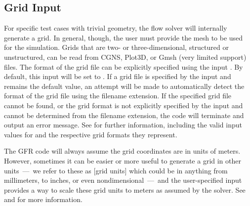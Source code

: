 \subsection{Grid Input}
\label{SEC:Files:Grid_Input}


For specific test cases with trivial geometry, the flow solver will internally
generate a grid.
%
In general, though, the user must provide the mesh to be used for the
simulation.  
%
Grids that are two- or three-dimensional, structured or unstructured, can be
read from 
  CGNS,
  Plot3D, or
  Gmsh (very limited support)
files.
%
The format of the grid file can be explicitly specified using the input
.
%
By default, this input will be set to .
%
If a grid file is specified by the input  and
 remains the default value,
an attempt will be made to automatically detect the format of the grid file
using the filename extension.
%
If the specified grid file cannot be found, or the grid format is not explicitly
specified by the input and cannot be determined from the filename extension, the
code will terminate and output an error message.
%
See  for further information, including the valid input
values for  and the respective grid formats they
represent.


The GFR code will always assume the grid coordinates are in units of meters.
%
However, sometimes it can be easier or more useful to generate a grid in other
units~---~we refer to these as
[grid units] which could be in anything
from millimeters, to inches, or even nondimensional~---~and the user-specified
input  provides a way to scale these grid units
to meters as assumed by the solver.
%
See  and
 for more information.


